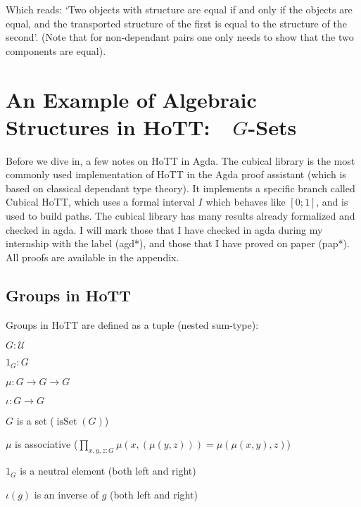 \documentclass{article}
\DeclareMathOperator{\isset}{isSet}
\begin{document}
Which reads: `Two objects with structure are equal if and only if the objects are equal, and the transported structure of the first is equal to the structure of the second'. (Note that for non-dependant pairs one only needs to show that the two components are equal).

\section{An Example of Algebraic Structures in HoTT:\  $G$-Sets}

Before we dive in, a few notes on HoTT in Agda. The cubical library is the most commonly used implementation of HoTT in the Agda proof assistant (which is based on classical dependant type theory). It implements a specific branch called Cubical HoTT, which uses a formal interval $I$ which behaves like $[0;1]$, and is used to build paths. The cubical library has many results already formalized and checked in agda. I will mark those that I have checked in agda during my internship with the label (agd*), and those that I have proved on paper (pap*). All proofs are available in the appendix.


\subsection{Groups in HoTT}

Groups in HoTT are defined as a tuple (nested sum-type):

\begin{itemize}
\begin{minipage}[c][3.2cm]{0.3\linewidth}
    \item $G : \mathcal{U}$
    \item $1_{G} : G$
    \item $\mu : G \to G \to G$
    \item $\iota : G \to G$
\end{minipage}
\begin{minipage}[c][3.2cm]{0.6\linewidth}
    \item $G$ is a set ($\isset(G)$)
    \item $\mu$ is associative ($\prod_{x,y,z : G} \mu(x,(\mu(y,z))) = \mu(\mu(x,y),z)$)
    \item $1_{G}$ is a neutral element (both left and right)
    \item $\iota(g)$ is an inverse of $g$ (both left and right)
\end{minipage}
\end{itemize}
\end{document}
